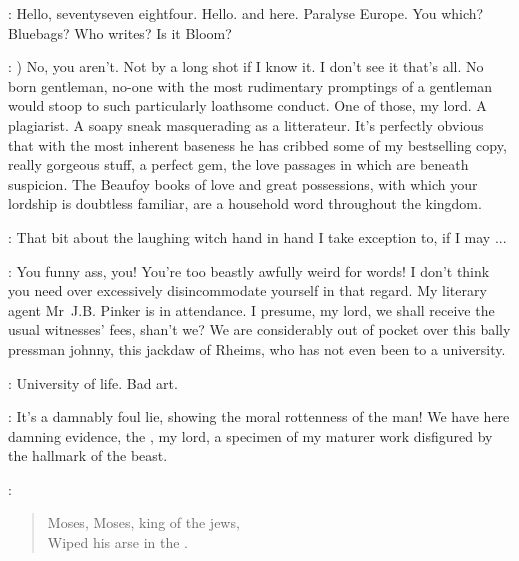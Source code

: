 \Myles:
Hello, seventyseven eightfour. Hello.
 and  here.
Paralyse Europe.
You which? Bluebags?
Who writes? Is it Bloom?


\Beaufoy:
)
No, you aren't.
Not by a long shot if I know it.
I don't see it that's all.
No born gentleman, no-one with the most rudimentary promptings of a gentleman
would stoop to such particularly loathsome conduct.
One of those, my lord.
A plagiarist.
A soapy sneak masquerading as a litterateur.
It's perfectly obvious that with the most inherent baseness
he has cribbed some of my bestselling copy, really gorgeous stuff,
a perfect gem, the love passages in which are beneath suspicion.
The Beaufoy books of love and great possessions,
with which your lordship is doubtless familiar,
are a household word throughout the kingdom.

\Bloom:
That bit about the laughing witch
hand in hand I take exception to, if I may ...

\Beaufoy:
You funny ass, you!
You're too beastly awfully weird for words!
I don't think you need over excessively disincommodate yourself in that regard.
My literary agent Mr~J.B. Pinker is in attendance.
I presume, my lord, we shall receive the usual witnesses' fees, shan't we?
We are considerably out of pocket over this bally pressman johnny,
this jackdaw of Rheims, who has not even been to a university.

\Bloom:
University of life. Bad art.

\Beaufoy:
It's a damnably foul lie, showing the moral rottenness of the man!
We have here damning evidence, the , my lord,
a specimen of my maturer work disfigured by the hallmark of the beast.

\GalleryVoice:
\begin{verse}
    Moses, Moses, king of the jews,\\
    Wiped his arse in the .
\end{verse}

